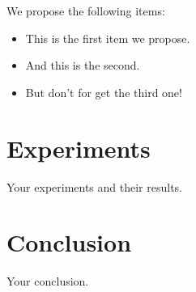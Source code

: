\documentclass[BibLaTeXsortingNone]{PHlab-thesis}
\begin{document}
We propose the following items:
%
\begin{itemize}
  \item This is the first item we propose.
  \item And this is the second.
  \item But don't for get the third one!
\end{itemize}


\chapter{Experiments}
Your experiments and their results.




\chapter{Conclusion}
Your conclusion.


\newpage
{}
\printbibliography[title={References}]
\end{document}
